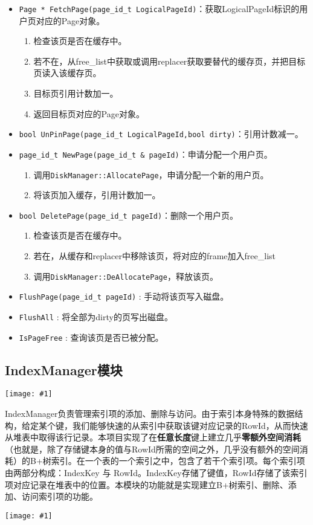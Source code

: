 \documentclass[12pt, a4paper]{article}
\def\c#1{\texttt{#1}}
\def\b#1{\textbf{#1}}
\def\ss#1{\subsection{#1}}
\def\pid{page\_id\_t\ }
\def\p{\par}
\def\g#1{\begin{center}\texttt{[image: \#1]}\end{center}}
\def\gm#1{\begin{center}\texttt{[image: \#1]}\end{center}}
\begin{document}
\begin{itemize}
  \item \c{Page * FetchPage(\pid LogicalPageId)}：获取LogicalPageId标识的用户页对应的Page对象。\begin{enumerate}
    \item 检查该页是否在缓存中。
    \item 若不在，从free\_list中获取或调用replacer获取要替代的缓存页，并把目标页读入该缓存页。
    \item 目标页引用计数加一。
    \item 返回目标页对应的Page对象。
  \end{enumerate}
  \item  \c{bool UnPinPage(\pid LogicalPageId,bool dirty)}：引用计数减一。
  \item \c{\pid NewPage(\pid \& pageId)}：申请分配一个用户页。\begin{enumerate}
    \item 调用\c{DiskManager::AllocatePage}，申请分配一个新的用户页。
    \item 将该页加入缓存，引用计数加一。
  \end{enumerate}
  \item \c{bool DeletePage(\pid pageId)}：删除一个用户页。\begin{enumerate}
    \item 检查该页是否在缓存中。
    \item 若在，从缓存和replacer中移除该页，将对应的frame加入free\_list
    \item 调用\c{DiskManager::DeAllocatePage}，释放该页。
  \end{enumerate}
  \item \c{FlushPage(\pid pageId)} : 手动将该页写入磁盘。
  \item \c{FlushAll} : 将全部为dirty的页写出磁盘。
  \item \c{IsPageFree} : 查询该页是否已被分配。 
\end{itemize}
\ss{IndexManager模块}
\gm{b_plus_tree_index.pdf}
\p IndexManager负责管理索引项的添加、删除与访问。由于索引本身特殊的数据结构，给定某个键，我们能够快速的从索引中获取该键对应记录的RowId，从而快速从堆表中取得该行记录。本项目实现了在\b{任意长度}键上建立几乎\b{零额外空间消耗}（也就是，除了存储键本身的值与RowId所需的空间之外，几乎没有额外的空间消耗）的B+树索引。在一个表的一个索引之中，包含了若干个索引项。每个索引项由两部分构成：IndexKey 与 RowId。IndexKey存储了键值，RowId存储了该索引项对应记录在堆表中的位置。本模块的功能就是实现建立B+树索引、删除、添加、访问索引项的功能。
\g{b_plus_tree.pdf}
\end{document}
